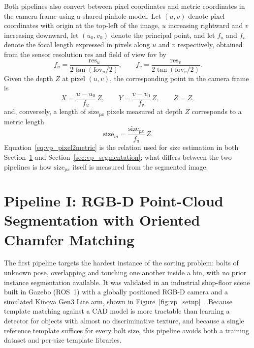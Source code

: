 Both pipelines also convert between pixel coordinates and metric coordinates in the camera frame
using a shared pinhole model. Let $(u,v)$ denote pixel coordinates with origin at the top-left of
the image, $u$ increasing rightward and $v$ increasing downward, let $(u_0, v_0)$ denote the
principal point, and let $f_u$ and $f_v$ denote the focal length expressed in pixels along $u$ and
$v$ respectively, obtained from the sensor resolution $\mathrm{res}$ and field of view
$\mathrm{fov}$ by
\begin{equation}
f_u = \frac{\mathrm{res}_u}{2\tan(\mathrm{fov}_u/2)}, \qquad
f_v = \frac{\mathrm{res}_v}{2\tan(\mathrm{fov}_v/2)}.
\label{eq:vp_focal}
\end{equation}
Given the depth $Z$ at pixel $(u,v)$, the corresponding point in the camera frame is
\begin{equation}
X = \frac{u - u_0}{f_u}\,Z, \qquad Y = \frac{v - v_0}{f_v}\,Z, \qquad Z = Z,
\label{eq:vp_backproject}
\end{equation}
and, conversely, a length of $\mathrm{size}_{px}$ pixels measured at depth $Z$ corresponds to a
metric length
\begin{equation}
\mathrm{size}_{m} = \frac{\mathrm{size}_{px}}{f_u}\,Z.
\label{eq:vp_pixel2metric}
\end{equation}
Equation~\eqref{eq:vp_pixel2metric} is the relation used for size estimation in both
Section~\ref{sec:vp_template} and Section~\ref{sec:vp_segmentation}; what differs between the two
pipelines is how $\mathrm{size}_{px}$ itself is measured from the segmented image.

\section{Pipeline I: RGB-D Point-Cloud Segmentation with Oriented Chamfer Matching}\label{sec:vp_template}

The first pipeline targets the hardest instance of the sorting problem: bolts of unknown pose,
overlapping and touching one another inside a bin, with no prior instance segmentation available.
It was validated in an industrial shop-floor scene built in Gazebo (ROS~1) with a globally
positioned RGB-D camera and a simulated Kinova Gen3 Lite arm, shown in
Figure~\ref{fig:vp_setup}~\citep{sk2024bolthandling}. Because template matching against a CAD
model is more tractable than learning a detector for objects with almost no discriminative
texture, and because a single reference template suffices for every bolt size, this pipeline
avoids both a training dataset and per-size template libraries.

